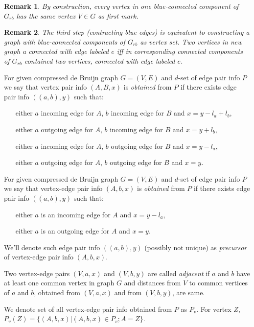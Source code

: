\documentclass[12pt,a4paper,oneside]{article}
\newtheorem{remark}{Remark}
\begin{document}
\begin{remark}
  By construction, every vertex in one blue-connected component of $G_{rb}$ has the same vertex $V \in G$ as first mark.
\end{remark}

\begin{remark}
 The third step (contracting blue edges) is equivalent to constructing a graph with blue-connected components of $G_{rb}$ as vertex set. Two vertices in new graph a connected with edge labeled $e$ iff in corresponding connected components of $G_{rb}$ contained two vertices, connected with edge labeled $e$.  
\end{remark}


For given compressed de Bruijn graph $G=(V,E)$ and $d$-set of edge pair info $P$ 
we say that vertex pair info $(A, B, x)$ is \emph{obtained} from $P$ if there exists edge pair info $((a,b),y)$ such that:
\begin{itemize}
\item[either] $a$ incoming edge for $A$, $b$ incoming edge for $B$ and $x=y-l_a+l_b$, 
\item[either] $a$ outgoing edge for $A$, $b$ incoming edge for $B$ and $x=y+l_b$, 
\item[either] $a$ incoming edge for $A$, $b$ outgoing edge for $B$ and $x=y-l_a$, 
\item[either] $a$ outgoing edge for $A$, $b$ outgoing edge for $B$ and $x=y$. 
\end{itemize} 

For given compressed de Bruijn graph $G=(V,E)$ and $d$-set of edge pair info $P$ 
we say that vertex-edge pair info $(A, b, x)$ is \emph{obtained} from $P$ if there exists edge pair info $((a,b),y)$ such that:
\begin{itemize}
\item[either] $a$ is an incoming edge for $A$ and $x=y-l_a$, 
\item[either] $a$ is an outgoing edge for $A$ and $x=y$. 
\end{itemize} 
We'll denote such edge pair info $((a, b), y)$ (possibly not unique) as \emph{precursor} of vertex-edge pair info $(A, b, x)$.

Two vertex-edge pairs $(V,a,x)$ and $(V,b,y)$ are called \emph{adjacent} if $a$ and $b$ have at least one common vertex in graph $G$ and distances from $V$ to common vertices of $a$ and $b$, obtained from $(V,a,x)$ and from $(V,b,y)$, are same. 


We denote set of all vertex-edge pair info obtained from $P$ as $P_v$.
For vertex $Z$, $P_v(Z) = \{(A, b, x)|(A, b, x) \in P_v; A = Z\}$.
 
\end{document}

